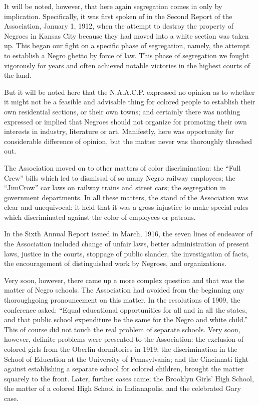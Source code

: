 \documentclass[letterpaper,10pt,english]{jupyterBook}
\begin{document}
\sphinxAtStartPar
It will be noted, however, that here again segregation comes in only by implication. Specifically, it was first spoken of in the Second Report of the Association, January 1, 1912, when the attempt to destroy the property of Negroes in Kansas City because they had moved into a white section was taken up. This began our fight on a specific phase of segregation, namely, the attempt to establish a Negro ghetto by force of law. This phase of segregation we fought vigorously for years and often achieved notable victories in the highest courts of the land.

\sphinxAtStartPar
But it will be noted here that the N.A.A.C.P. expressed no opinion as to whether it might not be a feasible and advisable thing for colored people to establish their own residential sections, or their own towns; and certainly there was nothing expressed or implied that Negroes should not organize for promoting their own interests in industry, literature or art. Manifestly, here was opportunity for considerable difference of opinion, but the matter never was thoroughly threshed out.

\sphinxAtStartPar
The Association moved on to other matters of color discrimination: the “Full Crew” bills which led to dismissal of so many Negro railway employees; the “Jim\sphinxhyphen{}Crow” car laws on railway trains and street cars; the segregation in government departments. In all these matters, the stand of the Association was clear and unequivocal: it held that it was a gross injustice to make special rules which discriminated against the color of employees or patrons.

\sphinxAtStartPar
In the Sixth Annual Report issued in March, 1916, the seven lines of endeavor of the Association included change of unfair laws, better administration of present laws, justice in the courts, stoppage of public slander, the investigation of facts, the encouragement of distinguished work by Negroes, and organizations.

\sphinxAtStartPar
Very soon, however, there came up a more complex question and that was the matter of Negro schools. The Association had avoided from the beginning any thoroughgoing pronouncement on this matter. In the resolutions of 1909, the conference asked: “Equal educational opportunities for all and in all the states, and that public school expenditure be the same for the Negro and white child.” This of course did not touch the real problem of separate schools. Very soon, however, definite problems were presented to the Association: the exclusion of colored girls from the Oberlin dormitories in 1919; the discrimination in the School of Education at the University of Pennsylvania; and the Cincinnati fight against establishing a separate school for colored children, brought the matter squarely to the front. Later, further cases came; the Brooklyn Girls’ High School, the matter of a colored High School in Indianapolis, and the celebrated Gary case.
\end{document}
